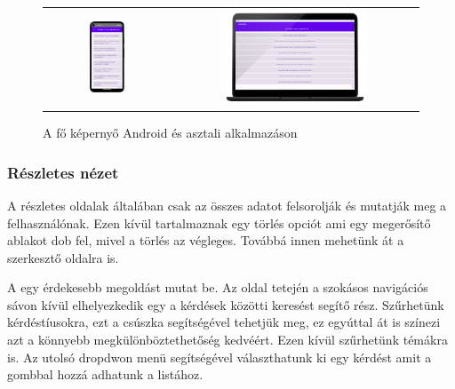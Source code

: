 \begin{figure}[!ht]
    \centering
    \begin{tabular}{cc}
        \includegraphics[width=0.3\textwidth, keepaspectratio]{figures/List_Android.png} & 
        \includegraphics[width=0.6\textwidth, keepaspectratio]{figures/ListView_Desktop_framed.png}
    \end{tabular}
    \caption{A fő képernyő Android és asztali alkalmazáson}
    \label{fig:ListScreen}
\end{figure}


\subsubsection{Részletes nézet}

A részletes oldalak általában csak az összes adatot felsorolják és mutatják meg a felhasználónak.
Ezen kívül tartalmaznak egy törlés opciót ami egy megerősítő ablakot dob fel, mivel a törlés az végleges.
Továbbá innen mehetünk át a szerkesztő oldalra is.

A  egy érdekesebb megoldást mutat be.
Az oldal tetején a szokásos navigációs sávon kívül elhelyezkedik egy a kérdések közötti keresést segítő rész.
Szűrhetünk kérdéstíusokra, ezt a csúszka segítségével tehetjük meg, ez egyúttal át is színezi azt a könnyebb megkülönböztethetőség kedvéért.
Ezen kívül szűrhetünk témákra is.
Az utolsó dropdwon menü segítségével választhatunk ki egy kérdést amit a gombbal hozzá adhatunk a listához.

